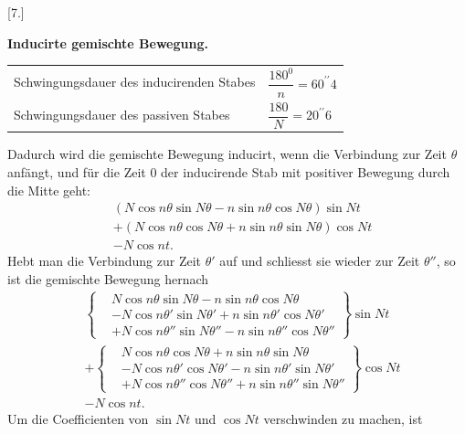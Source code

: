 \clearpage\begingroup{}
\begin{center}[7.]\end{center}
\noindent{\small [S. 214]}
\begin{center}\textbf{Inducirte gemischte Bewegung.}\end{center}
\noindent\hspace*{\parindent}\begin{tabular}{@{}l@{\quad}l@{}}
Schwingungsdauer des inducirenden Stabes&\(\dfrac{180^0}{n}=60^{\prime\prime}4\)\\[1ex]
Schwingungsdauer des passiven Stabes&\(\dfrac{180}{N}=20^{\prime\prime}6\)
\end{tabular}\par
\indent Dadurch wird die gemischte Bewegung inducirt, wenn die Verbindung
zur Zeit \(\theta\) anfängt, und für die Zeit \(0\) der inducirende Stab mit positiver
Bewegung durch die Mitte geht:
\[
\begin{aligned}
&(N\cos n\theta\sin N\theta-n\sin n\theta\cos N\theta)\sin Nt\\
&+(N\cos n\theta\cos N\theta+n\sin n\theta\sin N\theta)\cos Nt\\
&-N\cos nt.
\end{aligned}
\]
\noindent Hebt man die Verbindung zur Zeit \(\theta'\) auf und schliesst sie wieder zur Zeit
\(\theta''\), so ist die gemischte Bewegung hernach
\clearpage{}
\[
\begin{aligned}
&\left\{\begin{aligned}
&N\cos n\theta\sin N\theta-n\sin n\theta\cos N\theta\\
&-N\cos n\theta'\sin N\theta'+n\sin n\theta'\cos N\theta'\\
&+N\cos n\theta''\sin N\theta''-n\sin n\theta''\cos N\theta''
\end{aligned}\right\}\sin Nt\\[1ex]
&+\left\{\begin{aligned}
&N\cos n\theta\cos N\theta+n\sin n\theta\sin N\theta\\
&-N\cos n\theta'\cos N\theta'-n\sin n\theta'\sin N\theta'\\
&+N\cos n\theta''\cos N\theta''+n\sin n\theta''\sin N\theta''
\end{aligned}\right\}\cos Nt\\[1ex]
&-N\cos nt.
\end{aligned}
\]
\noindent Um die Coefficienten von \(\sin Nt\) und \(\cos Nt\) verschwinden zu machen, ist
